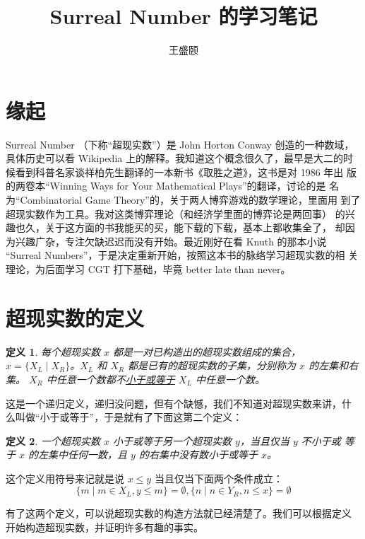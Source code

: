 \documentclass[cs4size,a4paper,adobefonts]{ctexart}
\newtheorem{defn}{定义}
\begin{document}
\title{\bfseries Surreal Number 的学习笔记}
\author{王盛颐}
\date{}
\maketitle
\section{缘起}

Surreal Number （下称“超现实数”）是 John Horton Conway 创造的一种数域，
具体历史可以看 Wikipedia 上的解释。我知道这个概念很久了，最早是大二的时
候看到科普名家谈祥柏先生翻译的一本新书《取胜之道》，这书是对 1986 年出
版的两卷本``Winning Ways for Your Mathematical Plays''的翻译，讨论的是
名为``Combinatorial Game Theory''的，关于两人博弈游戏的数学理论，里面用
到了超现实数作为工具。我对这类博弈理论（和经济学里面的博弈论是两回事）
的兴趣也久，关于这方面的书我能买的买，能下载的下载，基本上都收集全了，
却因为兴趣广杂，专注欠缺迟迟而没有开始。最近刚好在看 Knuth 的那本小说
``Surreal Numbers''，于是决定重新开始，按照这本书的脉络学习超现实数的相
关理论，为后面学习 CGT 打下基础，毕竟 better late than never。

\section{超现实数的定义}
\begin{defn}
  每个超现实数 $x$ 都是一对已构造出的超现实数组成的集合，$x=\{X_L \mid
  X_R\}$。$X_L$ 和 $X_R$ 都是已有的超现实数的子集，分别称为 $x$ 的左集和右集。
  $X_R$ 中任意一个数都不\underline{小于或等于} $X_L$ 中任意一个数。
\end{defn}

这是一个递归定义，递归没问题，但有个缺憾，我们不知道对超现实数来讲，什
么叫做“小于或等于”，于是就有了下面这第二个定义：

\begin{defn}
  一个超现实数 $x$ 小于或等于另一个超现实数 $y$，当且仅当 $y$ 不小于或
  等于 $x$ 的左集中任何一数，且 $y$ 的右集中没有数小于或等于 $x$。
\end{defn}

这个定义用符号来记就是说 $x \leq y$ 当且仅当下面两个条件成立：
$$
\{m \mid m\in X_L, y \leq m \}=\emptyset,
\{n \mid n\in Y_R, n \leq x \}=\emptyset
$$ 

有了这两个定义，可以说超现实数的构造方法就已经清楚了。我们可以根据定义
开始构造超现实数，并证明许多有趣的事实。
\end{document}
